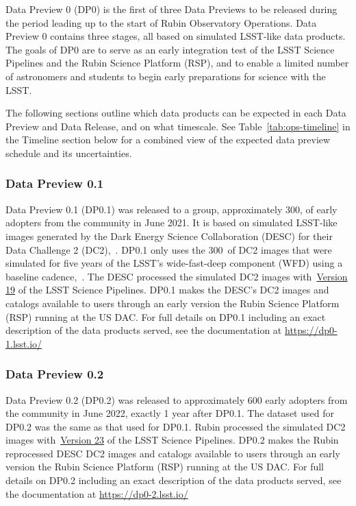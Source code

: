 Data Preview 0 (DP0) is the first of three Data Previews to be released during the period leading up to the start of Rubin Observatory Operations. 
Data Preview 0 contains three stages, all based on simulated LSST-like data products. 
The goals of DP0 are to serve as an early integration test of the LSST Science Pipelines and the Rubin Science Platform (RSP), and to enable a limited number of astronomers and students to begin early preparations for science with the LSST.

The following sections outline which data products can be expected in each Data Preview and Data Release, and on what timescale.
See Table~\ref{tab:ops-timeline} in the Timeline section below for a combined view of the expected data preview schedule and its uncertainties.

\subsubsection{Data Preview 0.1}
\label{sec:dp01}

Data Preview 0.1 (DP0.1) was released to a group, approximately 300,  of early adopters from the community in June 2021. 
It is based on simulated LSST-like images generated by the Dark Energy Science Collaboration (DESC) for their Data Challenge 2 (DC2),~\citep{2021ApJS..253...31L}.
DP0.1 only uses the 300~\sqdeg of DC2 images that were simulated for five years of the LSST’s wide-fast-deep component (WFD) using a baseline cadence,~.
The DESC processed the simulated DC2 images with~\href{https://pipelines.lsst.io/v/v19_0_0/index.html}{Version 19} of the LSST Science Pipelines.
DP0.1 makes the DESC’s DC2 images and catalogs available to users through an early version the Rubin Science Platform (RSP) running at the US DAC. 
For full details on DP0.1 including an exact description of the data products served, see the documentation at \url{https://dp0-1.lsst.io/}

\subsubsection{Data Preview 0.2}
\label{sec:dp02}

Data Preview 0.2 (DP0.2) was released to approximately 600 early adopters from the community in June 2022, exactly 1 year after DP0.1. 
The dataset used for DP0.2 was the same as that used for DP0.1.
Rubin processed the simulated DC2 images with~\href{https://pipelines.lsst.io/v/v23_0_0/index.html}{Version 23} of the LSST Science Pipelines.
DP0.2 makes the Rubin reprocessed DESC DC2 images and catalogs available to users through an early version the Rubin Science Platform (RSP) running at the US DAC. 
For full details on DP0.2 including an exact description of the data products served, see the documentation at \url{https://dp0-2.lsst.io/}

